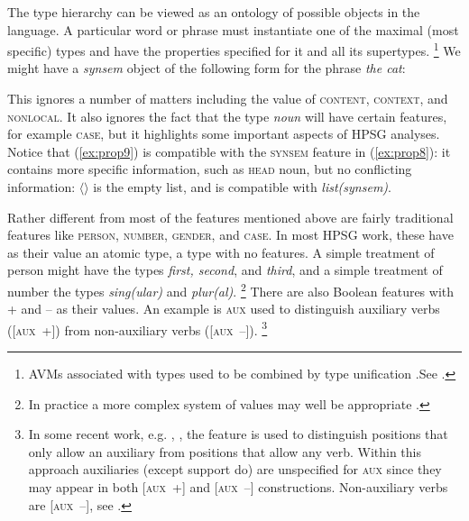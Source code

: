\documentclass[output=paper
	        ,collection
	        ,collectionchapter
 	        ,biblatex
                ,babelshorthands
                ,newtxmath
                ,draftmode
                ,colorlinks, citecolor=brown
]{langscibook}
\begin{document}
The type hierarchy can be viewed as an ontology of possible objects in the language. A particular word or phrase must instantiate one of the maximal (most specific) types and have the properties specified for it and all its supertypes.%
%
\footnote{AVMs associated with types used to be combined by type unification \citep{ps}.\inlineaddpages See .}
%
We might have a \emph{synsem} object of the following form for the phrase \emph{the cat}:

\ea\label{ex:prop9}
\z

This ignores a number of matters including the value of \textsc{content, context}, and \textsc{nonlocal}. It also ignores the fact that the type \emph{noun} will have certain features, for example \textsc{case}, but it highlights some important aspects of HPSG analyses. Notice that (\ref{ex:prop9}) is compatible with the \textsc{synsem} feature in (\ref{ex:prop8}): it contains more specific information, such as \textsc{head} noun, but no conflicting information: $\langle \rangle$ is the empty list, and is compatible with \emph{list(synsem)}.

Rather different from most of the features mentioned above are fairly traditional features like \textsc{person, number, gender}, and \textsc{case}. In most HPSG work, these have as their value an atomic type, a type with no features. A simple treatment of person might have the types \emph{first, second}, and \emph{third}, and a simple treatment of number the types \emph{sing(ular)} and \emph{plur(al)}.%
%
\footnote{In practice a more complex system of values may well be appropriate \citep{Flickinger2000a}.}
%
There are also Boolean features with + and – as their values. An example is \textsc{aux} used to distinguish auxiliary verbs ([\textsc{aux}~+]) from non-auxiliary verbs ([\textsc{aux}~–]).%
%
\footnote{In some recent work, e.g. \citet[157--162]{Sag2012a}, \citet{Sag2020a}, the feature is used to distinguish positions that only allow an auxiliary from positions that allow any verb. Within this approach auxiliaries (except support do) are unspecified for \textsc{aux} since they may appear in both [\textsc{aux}~+] and [\textsc{aux}~–] constructions. Non-auxiliary verbs are [\textsc{aux}~–], see .}
%
\end{document}
